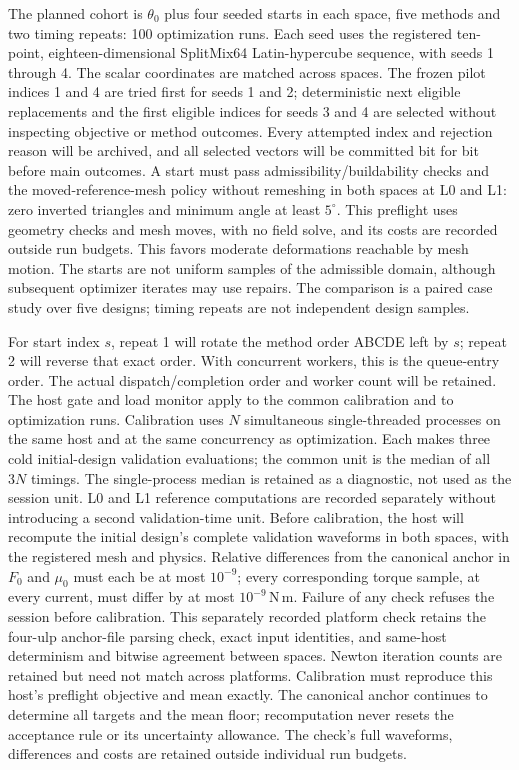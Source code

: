 The planned cohort is $\theta_0$ plus four seeded starts in each space, five
methods and two timing repeats: 100 optimization runs. Each seed uses the
registered ten-point, eighteen-dimensional SplitMix64 Latin-hypercube
sequence, with seeds 1 through 4.
The scalar coordinates are matched across
spaces. The frozen pilot indices 1 and 4 are tried first for seeds 1 and 2;
deterministic next eligible replacements and the first eligible indices for
seeds 3 and 4 are selected without inspecting objective or method outcomes.
Every attempted index and rejection reason will be archived, and all selected
vectors will be committed bit for bit before main outcomes.
A start must pass admissibility/buildability checks and the moved-reference-mesh
policy without remeshing in both spaces at L0 and L1: zero inverted triangles
and minimum angle at least $5^\circ$. This preflight uses geometry checks and
mesh moves, with no field solve, and its costs are recorded outside run
budgets. This favors moderate
deformations reachable by mesh motion. The starts are not uniform samples of
the admissible domain, although subsequent optimizer iterates may use repairs.
The comparison is a paired case study over five designs; timing repeats are
not independent design samples.

For start index $s$, repeat 1 will rotate the method order ABCDE left by $s$;
repeat 2 will reverse that exact order. With concurrent workers, this is the
queue-entry order. The actual dispatch/completion order and worker count will
be retained. The host gate and load monitor apply to the common calibration
and to optimization runs. Calibration uses $N$ simultaneous single-threaded
processes on the same host and at the same concurrency as optimization.
Each makes three cold initial-design validation evaluations; the common unit
is the median of all $3N$ timings. The single-process median is retained as a
diagnostic, not used as the session unit. L0 and L1 reference computations
are recorded separately without introducing a second validation-time unit.
Before calibration, the host will recompute the initial design's complete
validation waveforms in both spaces, with the registered mesh and physics.
Relative differences from the canonical anchor in $F_0$ and $\mu_0$ must each
be at most $10^{-9}$; every corresponding torque sample, at every current,
must differ by at most $10^{-9}\,\mathrm{N\,m}$. Failure of any check refuses
the session before calibration. This separately recorded platform check
retains the four-ulp anchor-file parsing check, exact input identities,
and same-host determinism and bitwise agreement between spaces.
Newton iteration counts are retained but need not match across platforms.
Calibration must reproduce this host's preflight objective and mean exactly.
The canonical anchor continues to determine all targets and the mean floor;
recomputation never resets the acceptance rule or its uncertainty allowance.
The check's full waveforms, differences and costs are retained outside
individual run budgets.

